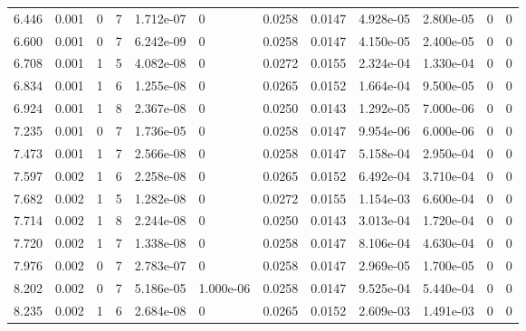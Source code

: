 \documentclass[preview]{standalone}
\begin{document}
{{\begin{tabular}{L{1.2cm}C{1.2cm} C{0.3cm}C{0.5cm} C{1.4cm}C{1.4cm} C{1.4cm}C{1.4cm} C{1.6cm}C{1.6cm} C{1.6cm}C{1.6cm}}
  6.446  &  0.001  & 0     &  7 &  1.712e-07  & 0  &  0.0258&   0.0147& 4.928e-05 & 2.800e-05   &  0 & 0  \\ 
  6.600  &  0.001  & 0     &  7 &  6.242e-09  & 0  &  0.0258&   0.0147& 4.150e-05 & 2.400e-05   &  0 & 0  \\ 
  6.708  &  0.001  & 1     &  5 &  4.082e-08  & 0  &  0.0272&   0.0155& 2.324e-04 & 1.330e-04   &  0 & 0  \\ 
  6.834  &  0.001  & 1     &  6 &  1.255e-08  & 0  &  0.0265&   0.0152& 1.664e-04 & 9.500e-05   &  0 & 0  \\ 
  6.924  &  0.001  & 1     &  8 &  2.367e-08  & 0  &  0.0250&   0.0143& 1.292e-05 & 7.000e-06   &  0 & 0  \\ 
  7.235  &  0.001  & 0     &  7 &  1.736e-05  & 0  &  0.0258&   0.0147& 9.954e-06 & 6.000e-06   &  0 & 0  \\ 
  7.473  &  0.001  & 1     &  7 &  2.566e-08  & 0  &  0.0258&   0.0147& 5.158e-04 & 2.950e-04   &  0 & 0  \\ 
  7.597  &  0.002  & 1     &  6 &  2.258e-08  & 0  &  0.0265&   0.0152& 6.492e-04 & 3.710e-04   &  0 & 0  \\ 
  7.682  &  0.002  & 1     &  5 &  1.282e-08  & 0  &  0.0272&   0.0155& 1.154e-03 & 6.600e-04   &  0 & 0  \\ 
  7.714  &  0.002  & 1     &  8 &  2.244e-08  & 0  &  0.0250&   0.0143& 3.013e-04 & 1.720e-04   &  0 & 0  \\ 
  7.720  &  0.002  & 1     &  7 &  1.338e-08  & 0  &  0.0258&   0.0147& 8.106e-04 & 4.630e-04   &  0 & 0  \\ 
  7.976  &  0.002  & 0     &  7 &  2.783e-07  & 0  &  0.0258&   0.0147& 2.969e-05 & 1.700e-05   &  0 & 0  \\ 
  8.202  &  0.002  & 0     &  7 &  5.186e-05  & 1.000e-06  &  0.0258&   0.0147& 9.525e-04 & 5.440e-04   &  0 & 0  \\ 
  8.235  &  0.002  & 1     &  6 &  2.684e-08  & 0  &  0.0265&   0.0152& 2.609e-03 & 1.491e-03   &  0 & 0  \\ 
\hline 
\end{tabular} 

}}
\end{document}
